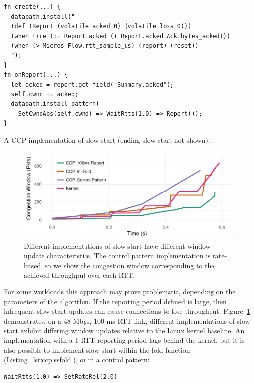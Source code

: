 \begin{listing}[t]
{\footnotesize
\begin{verbatim}
fn create(...) {
  datapath.install("
  (def (Report (volatile acked 0) (volatile loss 0)))
  (when true (:= Report.acked (+ Report.acked Ack.bytes_acked)))
  (when (> Micros Flow.rtt_sample_us) (report) (reset))
  ");
}
fn onReport(...) {
  let acked = report.get_field("Summary.acked");
  self.cwnd += acked;
  datapath.install_pattern(
    SetCwndAbs(self.cwnd) => WaitRtts(1.0) => Report());
}
\end{verbatim}
}
\caption{A CCP implementation of slow start (ending slow start not shown).} \label{lst:ccp:ss}
\end{listing}

\begin{figure}
    \centering
    \includegraphics[width=\columnwidth]{img/ss-evo}
    \caption{Different implementations of slow start have different window update characteristics. The control pattern implementation is rate-based, so we show the congestion window corresponding to the achieved throughput over each RTT.}
    \label{fig:ccp:ss}
\end{figure}

For some workloads this approach may prove problematic, depending on the parameters of the algorithm. If the reporting period defined is large, then infrequent slow start updates can cause connections to lose throughput.
Figure~\ref{fig:ccp:ss} demonstrates, on a $48$ Mbps, $100$ ms RTT link, different implementations of slow start exhibit differing window updates relative to the Linux kernel baseline.
An implementation with a 1-RTT reporting period lags behind the kernel, but it is also possible to implement slow start within the fold function (Listing~\ref{lst:ccp:ssfold}), or in a control pattern: 

\begin{verbatim}
WaitRtts(1.0) => SetRateRel(2.0)
\end{verbatim}

